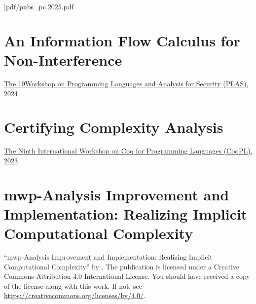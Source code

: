 {
}]{pdf/pubs_pc.2025.pdf}
\clearpage

\section{An Information Flow Calculus for Non-Interference}\label{ni-analysis}
{\href{https://plas24.github.io}
{The 19\thsup Workshop on Programming Languages and Analysis for Security (PLAS), 2024}}
{\abspage{}}

\clearpage

\section{Certifying Complexity Analysis}\label{coqpl}
\ainfoX{\CTNT}
{\href{https://popl23.sigplan.org/home/CoqPL-2023}
{The Ninth International Workshop on Coq for Programming Languages (CoqPL), 2023}}
{\abspage{}}

\clearpage


\section{mwp-Analysis Improvement and Implementation: Realizing Implicit Computational Complexity}\label{app:sec:fscd}
{\newline\enquote{mwp-Analysis Improvement and Implementation: Realizing Implicit Computational Complexity} \textcopyright{ }by{ }\CTNT.
The publication is licensed under a Creative Commons Attribution 4.0 International License.
You should have received a copy of the license along with this work.
If not, see \url{https://creativecommons.org/licenses/by/4.0/}.}

